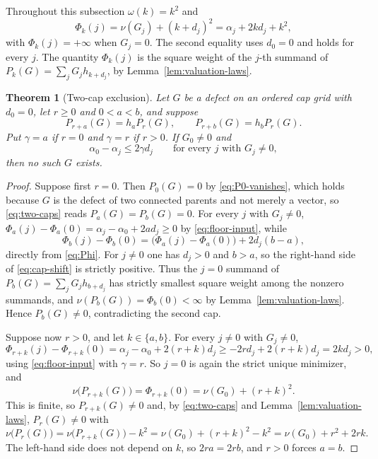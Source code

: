 \documentclass[11pt,a4paper]{amsart}
\numberwithin{equation}{section}
\theoremstyle{plain}
\newtheorem{theorem}{Theorem}[section]
\theoremstyle{definition}
\newcommand{\wt}{\nu}
\begin{document}
Throughout this subsection \(\omega(k)=k^2\) and
\begin{equation}\label{eq:Phi}
\Phi_k(j)=\wt(G_j)+(k+d_j)^2
=
\alpha_j+2kd_j+k^2,
\end{equation}
with \(\Phi_k(j)=+\infty\) when \(G_j=0\).  The second equality uses \(d_0=0\) and holds for every \(j\).  The quantity \(\Phi_k(j)\) is the square weight of the \(j\)-th summand of \(P_k(G)=\sum_j G_jh_{k+d_j}\), by Lemma~\ref{lem:valuation-laws}.

\begin{theorem}[Two-cap exclusion]\label{thm:two-cap}
Let \(G\) be a defect on an ordered cap grid with \(d_0=0\), let \(r\ge0\) and \(0<a<b\), and suppose
\begin{equation}\label{eq:two-caps}
P_{r+a}(G)=h_aP_r(G),
\qquad
P_{r+b}(G)=h_bP_r(G).
\end{equation}
Put \(\gamma=a\) if \(r=0\) and \(\gamma=r\) if \(r>0\).  If \(G_0\ne0\) and
\begin{equation}\label{eq:floor-input}
\alpha_0-\alpha_j\le2\gamma d_j
\qquad\text{for every }j\text{ with }G_j\ne0,
\end{equation}
then no such \(G\) exists.
\end{theorem}

\begin{proof}
Suppose first \(r=0\).  Then \(P_0(G)=0\) by \eqref{eq:P0-vanishes}, which holds because \(G\) is the defect of two connected parents and not merely a vector, so \eqref{eq:two-caps} reads \(P_a(G)=P_b(G)=0\).  For every \(j\) with \(G_j\ne0\), \(\Phi_a(j)-\Phi_a(0) = \alpha_j-\alpha_0+2ad_j \ge0\)
by \eqref{eq:floor-input}, while
\begin{equation}\label{eq:cap-shift}
\Phi_b(j)-\Phi_b(0)
=
\bigl(\Phi_a(j)-\Phi_a(0)\bigr)+2d_j(b-a),
\end{equation}
directly from \eqref{eq:Phi}.  For \(j\ne0\) one has \(d_j>0\) and \(b>a\), so the right-hand side of \eqref{eq:cap-shift} is strictly positive.  Thus the \(j=0\) summand of \(P_b(G)=\sum_jG_jh_{b+d_j}\) has strictly smallest square weight among the nonzero summands, and \(\wt(P_b(G))=\Phi_b(0)<\infty\) by Lemma~\ref{lem:valuation-laws}.  Hence \(P_b(G)\ne0\), contradicting the second cap.

Suppose now \(r>0\), and let \(k\in\{a,b\}\).  For every \(j\ne0\) with \(G_j\ne0\),
\[
\Phi_{r+k}(j)-\Phi_{r+k}(0)
=
\alpha_j-\alpha_0+2(r+k)d_j
\ge
-2rd_j+2(r+k)d_j
=
2kd_j
>0,
\]
using \eqref{eq:floor-input} with \(\gamma=r\).  So \(j=0\) is again the strict unique minimizer, and
\[
\wt\bigl(P_{r+k}(G)\bigr)
=
\Phi_{r+k}(0)
=
\wt(G_0)+(r+k)^2.
\]
This is finite, so \(P_{r+k}(G)\ne0\) and, by \eqref{eq:two-caps} and Lemma~\ref{lem:valuation-laws}, \(P_r(G)\ne0\) with
\[
\wt\bigl(P_r(G)\bigr)
=
\wt\bigl(P_{r+k}(G)\bigr)-k^2
=
\wt(G_0)+(r+k)^2-k^2
=
\wt(G_0)+r^2+2rk.
\]
The left-hand side does not depend on \(k\), so \(2ra=2rb\), and \(r>0\) forces \(a=b\).
\end{proof}
\end{document}
